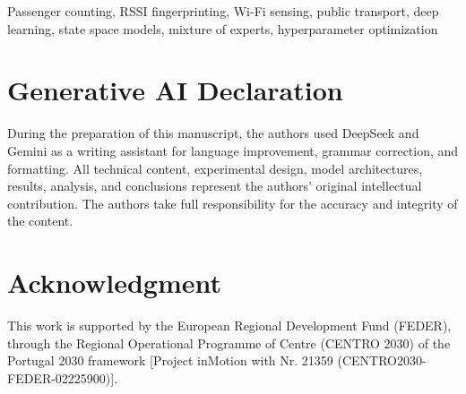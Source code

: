 \documentclass[conference]{IEEEtran}
\begin{document}
\begin{IEEEkeywords}
    Passenger counting, RSSI fingerprinting, Wi-Fi sensing, public transport, deep learning, state space models, mixture of experts, hyperparameter optimization
\end{IEEEkeywords}







\section{Generative AI Declaration}
During the preparation of this manuscript, the authors used DeepSeek and Gemini as a writing assistant for language improvement, grammar correction, and formatting. All technical content, experimental design, model architectures, results, analysis, and conclusions represent the authors' original intellectual contribution. The authors take full responsibility for the accuracy and integrity of the content.

\section*{Acknowledgment}
This work is supported by the European Regional Development Fund (FEDER), through the Regional Operational Programme of Centre (CENTRO 2030) of the Portugal 2030 framework [Project inMotion with Nr. 21359 (CENTRO2030-FEDER-02225900)].



\end{document}

